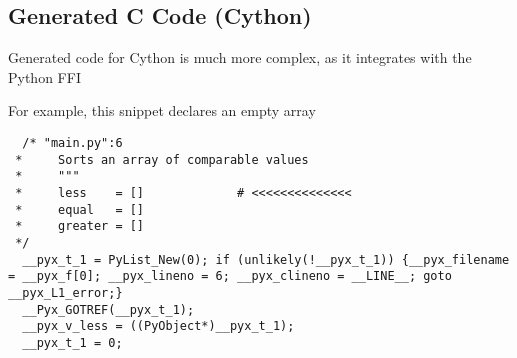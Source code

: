 \documentclass{article}
\begin{document}
\newpage
\subsection{Generated C Code (Cython)}

Generated code for Cython is much more complex, as it integrates with the Python FFI

For example, this snippet declares an empty array

\begin{lstlisting}
  /* "main.py":6
 *     Sorts an array of comparable values
 *     """
 *     less    = []             # <<<<<<<<<<<<<<
 *     equal   = []
 *     greater = []
 */
  __pyx_t_1 = PyList_New(0); if (unlikely(!__pyx_t_1)) {__pyx_filename = __pyx_f[0]; __pyx_lineno = 6; __pyx_clineno = __LINE__; goto __pyx_L1_error;}
  __Pyx_GOTREF(__pyx_t_1);
  __pyx_v_less = ((PyObject*)__pyx_t_1);
  __pyx_t_1 = 0;
\end{lstlisting}
\end{document}
